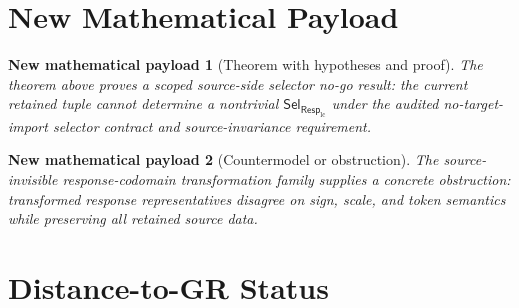 \documentclass[11pt]{article}
\newcommand{\RespLC}{\mathsf{Resp}_{\mathrm{lc}}}
\newcommand{\SelResp}{\mathsf{Sel}_{\RespLC}}
\newtheorem{payload}{New mathematical payload}
\begin{document}
\section{New Mathematical Payload}

\begin{payload}[Theorem with hypotheses and proof]
The theorem above proves a scoped source-side selector no-go result:
the current retained tuple cannot determine a nontrivial
\(\SelResp\) under the audited no-target-import selector contract and
source-invariance requirement.
\end{payload}

\begin{payload}[Countermodel or obstruction]
The source-invisible response-codomain transformation family supplies
a concrete obstruction: transformed response representatives disagree
on sign, scale, and token semantics while preserving all retained
source data.
\end{payload}

\section{Distance-to-GR Status}
\end{document}
